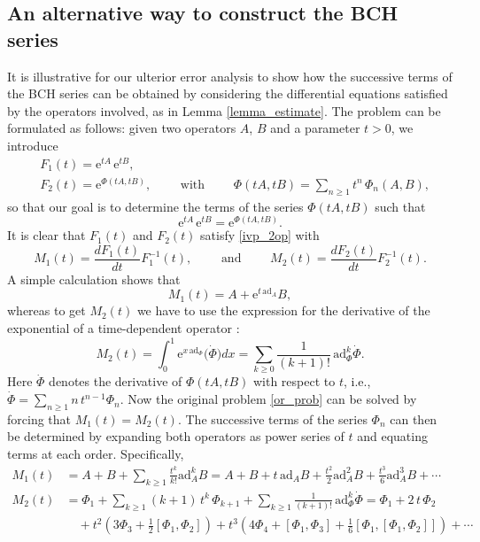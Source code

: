 \documentclass[11pt]{article}
\newcommand{\e}{\ensuremath{\mathrm{e}}}
\newcommand{\ad}{\ensuremath{\mathrm{ad}}}
\begin{document}
\subsection{An alternative way to construct the BCH series}

It is illustrative for our ulterior error analysis to show how the successive terms of the BCH series can be obtained by considering the
differential equations satisfied by the operators involved, as in Lemma \ref{lemma_estimate}. The problem can be formulated as follows: given two
operators $A$, $B$ and a parameter $t  > 0$, we introduce 
\[
\begin{aligned}
   & F_1(t) = \e^{t A} \, \e^{t B}, \\
   &  F_2(t) = \e^{\Phi(t A, t B)}, \qquad \mbox{ with } \qquad \Phi(tA,tB) = \sum_{n \ge 1} t^n \, \Phi_n(A,B),
\end{aligned}   
\]
so that our goal is to determine the terms of the series $\Phi(tA,tB)$ such that
\begin{equation} \label{or_prob}
  \e^{t A} \, \e^{t B} = \e^{\Phi(t A, t B)}.
\end{equation}  
It is clear that $F_1(t)$ and $F_2(t)$ satisfy \eqref{ivp_2op} with
\begin{equation} \label{def_emes}
  M_1(t) = \frac{dF_1(t)}{dt} F_1^{-1}(t), \qquad \mbox{ and } \qquad   M_2(t) = \frac{dF_2(t)}{dt} F_2^{-1}(t). 
\end{equation}  
A simple calculation shows that
\[
   M_1(t) = A + \e^{t \, \ad_{A}} B, 
\]
whereas to get $M_2(t)$ we have to use the expression for the
derivative of the exponential of a time-dependent operator  \cite{blanes09tme}:
\[    
   M_2(t) = \int_0^1 \e^{x \, \ad_{\Phi}} \big(\dot{\Phi}\big) dx = \sum_{k \ge 0} \frac{1}{(k+1)!} \, \ad_{\Phi}^k \dot{\Phi}.
\]
Here $\dot{\Phi}$ denotes the derivative of $\Phi(tA, tB)$ with respect to $t$, i.e., $\dot{\Phi} = \sum_{n \ge 1} n \, t^{n-1} \Phi_n$. Now the original problem
\eqref{or_prob} can be solved by forcing that $M_1(t) = M_2(t)$. The successive terms of the series $\Phi_n$ can then be determined by expanding both
operators as power series of $t$ and equating terms at each order. Specifically, 
\[
\begin{aligned}
   M_1(t) & = A + B + \sum_{k \ge 1} \frac{t^k}{k!} \ad_A^k B = A + B + t \, \ad_A B  + \frac{t^2}{2} \ad_A^2 B + \frac{t^3}{6} \ad_A^3 B + \cdots \\
   M_2(t) & = \Phi_1 + \sum_{k\ge1} (k+1) \, t^k \, \Phi_{k+1} + \sum_{k \ge 1} \frac{1}{(k+1)!} \, \ad_{\Phi}^k \dot{\Phi} = \Phi_1 + 2 \, t \, \Phi_2  \\
   &  \quad  + t^2 \left( 3 \Phi_3 + \frac{1}{2} [\Phi_1, \Phi_2] \right) + t^3 \left( 4 \Phi_4 + [\Phi_1, \Phi_3] + 
           \frac{1}{6} [\Phi_1, [\Phi_1, \Phi_2]] \right) + \cdots
\end{aligned}
\]  
\end{document}
